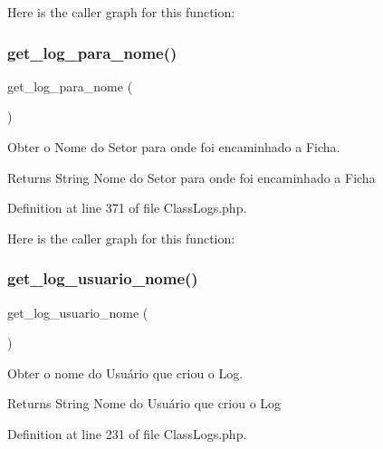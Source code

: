 Here is the caller graph for this function\+:
\mbox{\label{class_class_logs_a47f48e084a822dd6a389575e01acea00}} 
\subsubsection{\texorpdfstring{get\+\_\+log\+\_\+para\+\_\+nome()}{get\_log\_para\_nome()}}
{\footnotesize\ttfamily get\+\_\+log\+\_\+para\+\_\+nome (\begin{DoxyParamCaption}{ }\end{DoxyParamCaption})}



Obter o Nome do Setor para onde foi encaminhado a Ficha. 

\begin{DoxyReturn}{Returns}
String Nome do Setor para onde foi encaminhado a Ficha 
\end{DoxyReturn}


Definition at line 371 of file Class\+Logs.\+php.

Here is the caller graph for this function\+:
\mbox{\label{class_class_logs_ac8005c9321ce5ae129c81180a26a3403}} 
\subsubsection{\texorpdfstring{get\+\_\+log\+\_\+usuario\+\_\+nome()}{get\_log\_usuario\_nome()}}
{\footnotesize\ttfamily get\+\_\+log\+\_\+usuario\+\_\+nome (\begin{DoxyParamCaption}{ }\end{DoxyParamCaption})}



Obter o nome do Usuário que criou o Log. 

\begin{DoxyReturn}{Returns}
String Nome do Usuário que criou o Log 
\end{DoxyReturn}


Definition at line 231 of file Class\+Logs.\+php.

